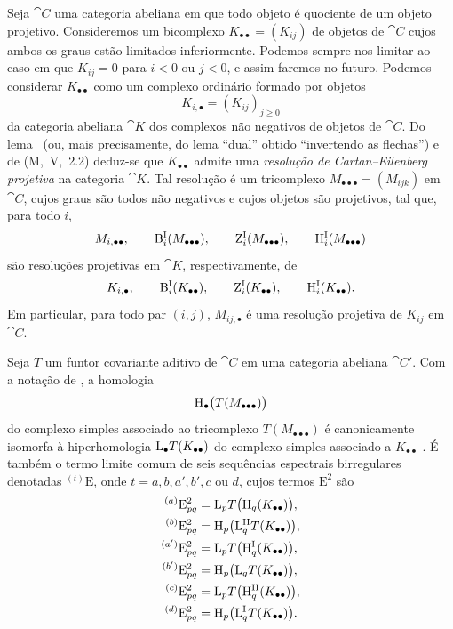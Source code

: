 \begin{env}[11.7.1]
\label{0.11.7.1}
Seja $\cat{C}$ uma categoria abeliana em que todo objeto é quociente de um
objeto projetivo.
Consideremos um bicomplexo $K_{\bullet\bullet}=(K_{ij})$ de objetos de $\cat{C}$ cujos
ambos os graus estão limitados inferiormente.
Podemos sempre nos limitar ao caso em que $K_{ij}=0$ para $i<0$ ou
$j<0$, e assim faremos no futuro.
Podemos considerar $K_{\bullet\bullet}$ como um complexo ordinário formado por
objetos
\[
  K_{i,\bullet}=(K_{ij})_{j\geq 0}
\]
da categoria abeliana $\cat{K}$ dos complexos não negativos de objetos de
$\cat{C}$.
Do lema~ (ou, mais precisamente, do lema
``dual'' obtido ``invertendo as flechas'') e de (M,~V,~2.2) deduz-se
que $K_{\bullet\bullet}$ admite uma \emph{resolução de Cartan--Eilenberg
projetiva} na categoria $\cat{K}$.
Tal resolução é um tricomplexo
$M_{\bullet\bullet\bullet}=(M_{ijk})$ em $\cat{C}$, cujos graus são todos
não negativos e cujos objetos são projetivos, tal que, para todo $i$,
\[
  M_{i,\bullet\bullet},\qquad
  \mathrm{B}^{\mathrm{I}}_i(M_{\bullet\bullet\bullet}),\qquad
  \mathrm{Z}^{\mathrm{I}}_i(M_{\bullet\bullet\bullet}),\qquad
  \mathrm{H}^{\mathrm{I}}_i(M_{\bullet\bullet\bullet})
\]
são resoluções projetivas em $\cat{K}$, respectivamente, de
\[
  K_{i,\bullet},\qquad
  \mathrm{B}^{\mathrm{I}}_i(K_{\bullet\bullet}),\qquad
  \mathrm{Z}^{\mathrm{I}}_i(K_{\bullet\bullet}),\qquad
  \mathrm{H}^{\mathrm{I}}_i(K_{\bullet\bullet}).
\]
Em particular, para todo par $(i,j)$, $M_{ij,\bullet}$ é uma resolução
projetiva de $K_{ij}$ em $\cat{C}$.
\end{env}

\begin{proposition}[11.7.2]
\label{0.11.7.2}
Seja $T$ um funtor covariante aditivo de $\cat{C}$ em uma categoria
abeliana $\cat{C}'$.
Com a notação de , a homologia
\[
  \mathrm{H}_\bullet\bigl(T(M_{\bullet\bullet\bullet})\bigr)
\]
do complexo simples associado ao tricomplexo
$T(M_{\bullet\bullet\bullet})$ é canonicamente isomorfa à
hiperhomologia $\mathrm{L}_\bullet T(K_{\bullet\bullet})$ do
complexo simples associado a $K_{\bullet\bullet}$
.
É também o termo limite comum de seis sequências espectrais birregulares denotadas
${}^{(t)}\mathrm{E}$, onde $t=a,b,a',b',c$ ou $d$, cujos
termos $\mathrm{E}^2$ são
\[
\begin{aligned}
  {}^{(a)}\mathrm{E}^2_{pq}
    &= \mathrm{L}_pT\bigl(\mathrm{H}_q(K_{\bullet\bullet})\bigr),\\
  {}^{(b)}\mathrm{E}^2_{pq}
    &= \mathrm{H}_p\bigl(\mathrm{L}^{\mathrm{II}}_qT(K_{\bullet\bullet})\bigr),\\
  {}^{(a')}\mathrm{E}^2_{pq}
    &= \mathrm{L}_pT\bigl(\mathrm{H}^{\mathrm{I}}_q(K_{\bullet\bullet})\bigr),\\
  {}^{(b')}\mathrm{E}^2_{pq}
    &= \mathrm{H}_p\bigl(\mathrm{L}_qT(K_{\bullet\bullet})\bigr),\\
  {}^{(c)}\mathrm{E}^2_{pq}
    &= \mathrm{L}_pT\bigl(\mathrm{H}^{\mathrm{II}}_q(K_{\bullet\bullet})\bigr),\\
  {}^{(d)}\mathrm{E}^2_{pq}
    &= \mathrm{H}_p\bigl(\mathrm{L}^{\mathrm{I}}_qT(K_{\bullet\bullet})\bigr).
\end{aligned}
\]
\end{proposition}

